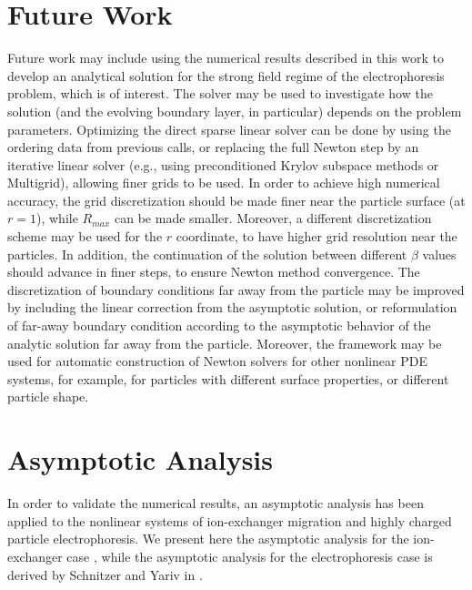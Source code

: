 \documentclass[preprint,10pt]{elsarticle}
\begin{document}
\section{Future Work}
Future work may include using the numerical results described in this work to develop
an analytical solution for the strong field regime of the electrophoresis problem, which is 
of interest. The solver may be used to investigate how the solution
(and the evolving boundary layer, in particular) depends on the problem parameters.
Optimizing the direct sparse linear solver can be done by
using the ordering data from previous calls,
or replacing the full Newton step by an iterative linear solver
(e.g., using preconditioned Krylov subspace methods \cite{saad2003book} or
Multigrid), allowing finer grids to be used.
In order to achieve high numerical accuracy, the grid discretization should be made finer
near the particle surface (at $r = 1$), while $R_{max}$ can be made smaller. Moreover, a different discretization scheme may be used for
the $r$ coordinate, to have higher grid resolution near the particles.
In addition, the continuation of the solution between different $\beta$ values
should advance in finer steps, to ensure Newton method convergence.
The discretization of boundary conditions far away from the particle may be improved
by including the linear correction from the asymptotic solution, or reformulation of
far-away boundary condition according to the asymptotic behavior of the analytic solution
far away from the particle.
Moreover, the framework may be used for automatic construction of Newton solvers 
for other nonlinear PDE systems, for example, for particles with different surface 
properties, or different particle shape.

\appendix

\section{Asymptotic Analysis} \label{sec:asymp}
In order to validate the numerical results, an asymptotic analysis has been applied 
to the nonlinear systems of ion-exchanger migration 
and highly charged particle electrophoresis.
We present here the asymptotic analysis for the ion-exchanger case \cite{yariv2010migration},
while the asymptotic analysis for the electrophoresis case \cite{schnitzer2012surface}
is derived by Schnitzer and Yariv in \cite{schnitzer2012cubic}.
\end{document}
